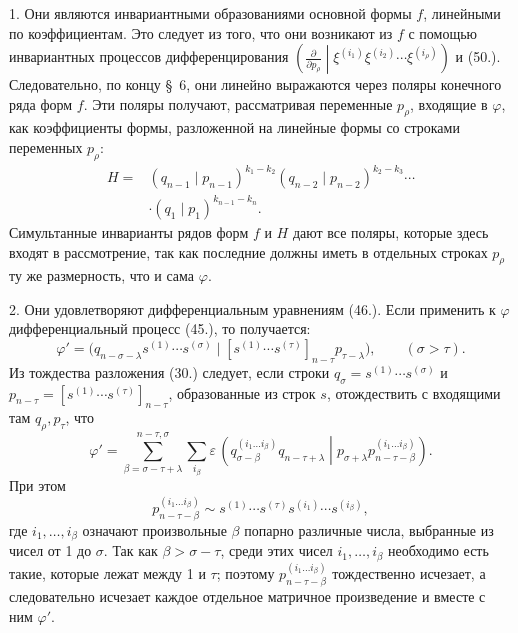 \documentclass[11pt]{article}
\newcommand{\pair}[2]{\left(#1\middle|#2\right)}
\newcommand{\eps}{\varepsilon}
\begin{document}
1. Они являются инвариантными образованиями основной формы $f$, линейными по коэффициентам. Это следует из того, что они возникают из $f$ с помощью инвариантных процессов дифференцирования
$\left(\frac{\partial}{\partial p_\rho}\middle|\xi^{(i_1)}\xi^{(i_2)}\cdots\xi^{(i_\rho)}\right)$ и (50.). Следовательно, по концу \S\ 6, они линейно выражаются через поляры конечного ряда форм $f$. Эти поляры получают, рассматривая переменные $p_\rho$, входящие в $\varphi$, как коэффициенты формы, разложенной на линейные формы со строками переменных $p_\rho$:
\begin{equation}
\begin{aligned}
 H={}&(q_{n-1}\mid p_{n-1})^{k_1-k_2}
(q_{n-2}\mid p_{n-2})^{k_2-k_3}\cdots\\
&\cdot(q_1\mid p_1)^{k_{n-1}-k_n}.
\end{aligned}
\tag{52}
\end{equation}
Симультанные инварианты рядов форм $f$ и $H$ дают все поляры, которые здесь входят в рассмотрение, так как последние должны иметь в отдельных строках $p_\rho$ ту же размерность, что и сама $\varphi$.

2. Они удовлетворяют дифференциальным уравнениям (46.). Если применить к $\varphi$ дифференциальный процесс (45.), то получается:
\[
 \varphi'=\bigl(q_{n-\sigma-\lambda}s^{(1)}\cdots s^{(\sigma)}\mid [s^{(1)}\cdots s^{(\tau)}]_{n-\tau}p_{\tau-\lambda}\bigr),\qquad (\sigma>\tau).
\]
Из тождества разложения (30.) следует, если строки $q_\sigma=s^{(1)}\cdots s^{(\sigma)}$ и $p_{n-\tau}=[s^{(1)}\cdots s^{(\tau)}]_{n-\tau}$, образованные из строк $s$, отождествить с входящими там $q_\rho,p_\tau$, что
\[
 \varphi'=\sum_{\beta=\sigma-\tau+\lambda}^{n-\tau,\sigma}\sum_{i_\beta}\eps\,
 \pair{q_{\sigma-\beta}^{(i_1\ldots i_\beta)}q_{n-\tau+\lambda}}{p_{\sigma+\lambda}p_{n-\tau-\beta}^{(i_1\ldots i_\beta)}}.
\]
При этом
\[
 p_{n-\tau-\beta}^{(i_1\ldots i_\beta)}\sim s^{(1)}\cdots s^{(\tau)}s^{(i_1)}\cdots s^{(i_\beta)},
\]
где $i_1,\ldots,i_\beta$ означают произвольные $\beta$ попарно различные числа, выбранные из чисел от 1 до $\sigma$. Так как $\beta>\sigma-\tau$, среди этих чисел $i_1,\ldots,i_\beta$ необходимо есть такие, которые лежат между 1 и $\tau$; поэтому $p_{n-\tau-\beta}^{(i_1\ldots i_\beta)}$ тождественно исчезает, а следовательно исчезает каждое отдельное матричное произведение и вместе с ним $\varphi'$.
\end{document}

